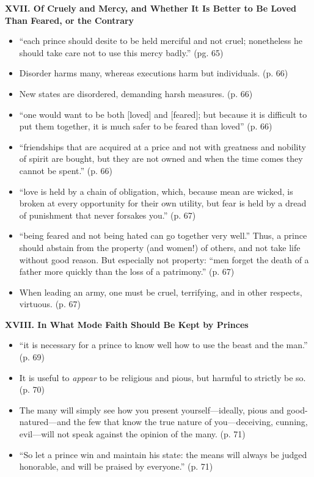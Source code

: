 \documentclass[10pt]{article}
\newcommand{\keyquote}[1]{{\color{BrickRed}#1}}
\begin{document}
\textbf{XVII. Of Cruely and Mercy, and Whether It Is Better to Be Loved
Than Feared, or the Contrary}
\begin{itemize}
    \item 
    \keyquote{
    ``each prince should desite to be held merciful and not 
    cruel; nonetheless he should take care not to use this mercy
    badly.''} (pg. 65)
\item 
    Disorder harms many, whereas executions harm but individuals. (p. 66)
\item 
    New states are disordered, demanding harsh measures. (p. 66)
\item 
    \keyquote{
    ``one would want to be both [loved] and [feared]; but because it is
    difficult to put them together, it is much safer to be feared than 
    loved''} (p. 66)
\item 
    \keyquote{
    ``friendships that are acquired at a price and not with greatness
    and nobility of spirit are bought, but they are not owned and when
    the time comes they cannot be spent.'' 
    } (p. 66)
\item
    ``love is held by a chain of obligation, which, because mean are
    wicked, is broken at every opportunity for their own utility, but
    fear is held by a dread of punishment that never forsakes you.''
    (p. 67)
\item 
    \keyquote{
    ``being feared and not being hated can go together very well.''
    } Thus, a prince should abstain from the property (and
    women!) of others, and not take life without good reason. But
    especially not property: ``men forget the death of a father
    more quickly than the loss of a patrimony.'' (p. 67)
\item
    When leading an army, one must be cruel, terrifying, and in
    other respects, virtuous. (p. 67)
\end{itemize}

\textbf{XVIII. In What Mode Faith Should Be Kept by Princes}
\begin{itemize}
\item
    \keyquote{
    ``it is necessary for a prince to know well how to use the 
    beast and the man.''
    } (p. 69)
\item
    It is useful to \textsl{appear} to be religious and pious,
    but harmful to strictly be so. (p. 70)
\item
    The many will simply see how you present yourself---ideally,
    pious and good-natured---and the few that know the true 
    nature of you---deceiving, cunning, evil---will not speak
    against the opinion of the many. (p. 71)
\item
    ``So let a prince win and maintain his state: the means will
    always be judged honorable, and will be praised by everyone.''
    (p. 71)
\end{itemize}
\end{document}
